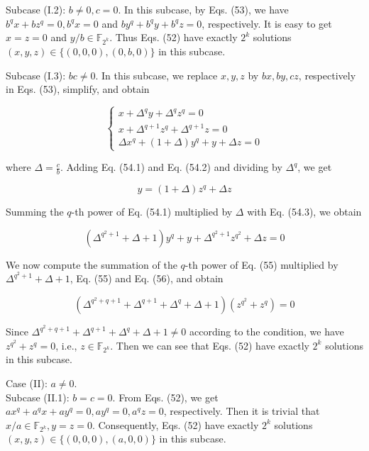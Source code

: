 \documentclass[10pt]{article}
\begin{document}
Subcase (I.2): $b \neq 0, c=0$. In this subcase, by Eqs. (53), we have $b^{q} x+b z^{q}=0, b^{q} x=0$ and $b y^{q}+b^{q} y+b^{q} z=0$, respectively. It is easy to get $x=z=0$ and $y / b \in \mathbb{F}_{2^{k}}$. Thus Eqs. (52) have exactly $2^{k}$ solutions $(x, y, z) \in\{(0,0,0),(0, b, 0)\}$ in this subcase.

Subcase (I.3): $b c \neq 0$. In this subcase, we replace $x, y, z$ by $b x, b y, c z$, respectively in Eqs. (53), simplify, and obtain

\[
\left\{\begin{array}{l}
x+\Delta^{q} y+\Delta^{q} z^{q}=0  \tag{54.1}\\
x+\Delta^{q+1} z^{q}+\Delta^{q+1} z=0 \\
\Delta x^{q}+(1+\Delta) y^{q}+y+\Delta z=0
\end{array}\right.
\]

where $\Delta=\frac{c}{b}$. Adding Eq. (54.1) and Eq. (54.2) and dividing by $\Delta^{q}$, we get


\begin{equation*}
y=(1+\Delta) z^{q}+\Delta z \tag{55}
\end{equation*}


Summing the $q$-th power of Eq. (54.1) multiplied by $\Delta$ with Eq. (54.3), we obtain


\begin{equation*}
\left(\Delta^{q^{2}+1}+\Delta+1\right) y^{q}+y+\Delta^{q^{2}+1} z^{q^{2}}+\Delta z=0 \tag{56}
\end{equation*}


We now compute the summation of the $q$-th power of Eq. (55) multiplied by $\Delta^{q^{2}+1}+\Delta+1$, Eq. (55) and Eq. (56), and obtain

$$
\left(\Delta^{q^{2}+q+1}+\Delta^{q+1}+\Delta^{q}+\Delta+1\right)\left(z^{q^{2}}+z^{q}\right)=0
$$

Since $\Delta^{q^{2}+q+1}+\Delta^{q+1}+\Delta^{q}+\Delta+1 \neq 0$ according to the condition, we have $z^{q^{2}}+z^{q}=0$, i.e., $z \in \mathbb{F}_{2^{k}}$. Then we can see that Eqs. (52) have exactly $2^{k}$ solutions in this subcase.

Case (II): $a \neq 0$.\\
Subcase (II.1): $b=c=0$. From Eqs. (52), we get $a x^{q}+a^{q} x+a y^{q}=0, a y^{q}=0, a^{q} z=0$, respectively. Then it is trivial that $x / a \in \mathbb{F}_{2^{k}}, y=z=0$. Consequently, Eqs. (52) have exactly $2^{k}$ solutions $(x, y, z) \in \{(0,0,0),(a, 0,0)\}$ in this subcase.
\end{document}
